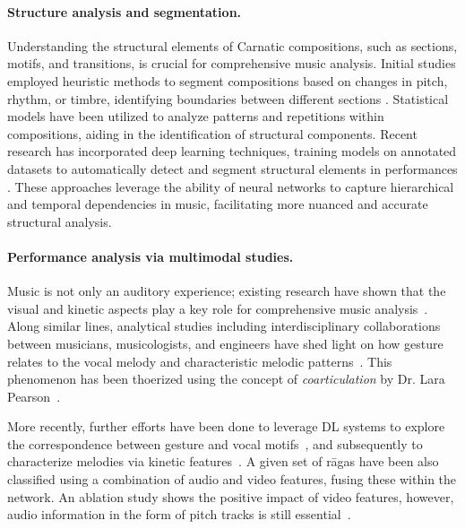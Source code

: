 \paragraph*{Structure analysis and segmentation.}
Understanding the structural elements of Carnatic compositions, such as sections, motifs, and transitions, is crucial for comprehensive music analysis. Initial studies employed heuristic methods to segment compositions based on changes in pitch, rhythm, or timbre, identifying boundaries between different sections \citep{verma-structural}. Statistical models have been utilized to analyze patterns and repetitions within compositions, aiding in the identification of structural components. Recent research has incorporated deep learning techniques, training models on annotated datasets to automatically detect and segment structural elements in performances \citep{ranjani-structural}. These approaches leverage the ability of neural networks to capture hierarchical and temporal dependencies in music, facilitating more nuanced and accurate structural analysis.

\paragraph*{Performance analysis via multimodal studies.} Music is not only an auditory experience; existing research have shown that the visual and kinetic aspects play a key role for comprehensive music analysis~\citep{clarke-motion,godoy-motor_mimetic,eitan-multimodal,pearson-coarticulation,sanidha-multimodal}. Along similar lines, analytical studies including interdisciplinary collaborations between musicians, musicologists, and engineers have shed light on how gesture relates to the vocal melody and characteristic melodic patterns~\citep{pearson-gesture_sonic,pearson-gesture_coupling,pearson-landscapes}. This phenomenon has been thoerized using the concept of \textit{coarticulation} by Dr. Lara Pearson~\citep{pearson-coarticulation}. 


More recently, further efforts have been done to leverage \acrshort{DL} systems to explore the correspondence between gesture and vocal motifs~\citep{nadkarni-exploring}, and subsequently to characterize melodies via kinetic features~\citep{nadkarni-gesture_motifs}. A given set of r\={a}gas have been also classified using a combination of audio and video features, fusing these within the network. An ablation study shows the positive impact of video features, however, audio information in the form of pitch tracks is still essential~\citep{clayton-raga_classification}.



